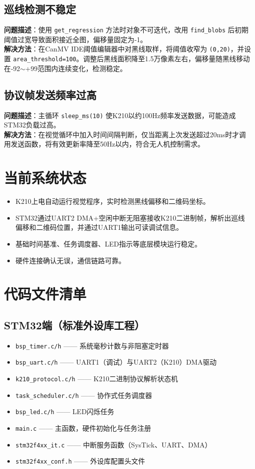 \documentclass{article}
\begin{document}
\subsection{巡线检测不稳定}
\textbf{问题描述}：使用 \texttt{get\_regression} 方法时对象不可迭代，改用 \texttt{find\_blobs} 后初期阈值过宽导致面积接近全图，偏移量固定为‑1。\\
\textbf{解决方法}：在CanMV IDE阈值编辑器中对黑线取样，将阈值收窄为 \texttt{(0,20)}，并设置 \texttt{area\_threshold=100}。调整后黑线面积降至1.5万像素左右，偏移量随黑线移动在‑92$\sim$+99范围内连续变化，检测稳定。

\subsection{协议帧发送频率过高}
\textbf{问题描述}：主循环 \texttt{sleep\_ms(10)} 使K210以约100Hz频率发送数据，可能造成STM32负载过高。\\
\textbf{解决方法}：在视觉循环中加入时间间隔判断，仅当距离上次发送超过20ms时才调用发送函数，将有效更新率降至50Hz以内，符合无人机控制需求。

\section{当前系统状态}
\begin{itemize}
    \item K210上电自动运行视觉程序，实时检测黑线偏移和二维码坐标。
    \item STM32通过UART2 DMA+空闲中断无阻塞接收K210二进制帧，解析出巡线偏移和二维码位置，并通过UART1输出可读调试信息。
    \item 基础时间基准、任务调度器、LED指示等底层模块运行稳定。
    \item 硬件连接确认无误，通信链路可靠。
\end{itemize}

\section{代码文件清单}

\subsection{STM32端（标准外设库工程）}
\begin{itemize}
    \item \texttt{bsp\_timer.c/h}         —— 系统毫秒计数与非阻塞定时器
    \item \texttt{bsp\_uart.c/h}          —— UART1（调试）与UART2（K210）DMA驱动
    \item \texttt{k210\_protocol.c/h}     —— K210二进制协议解析状态机
    \item \texttt{task\_scheduler.c/h}    —— 协作式任务调度器
    \item \texttt{bsp\_led.c/h}           —— LED闪烁任务
    \item \texttt{main.c}                —— 主函数，硬件初始化与任务注册
    \item \texttt{stm32f4xx\_it.c}        —— 中断服务函数（SysTick、UART、DMA）
    \item \texttt{stm32f4xx\_conf.h}      —— 外设库配置头文件
\end{itemize}
\end{document}

